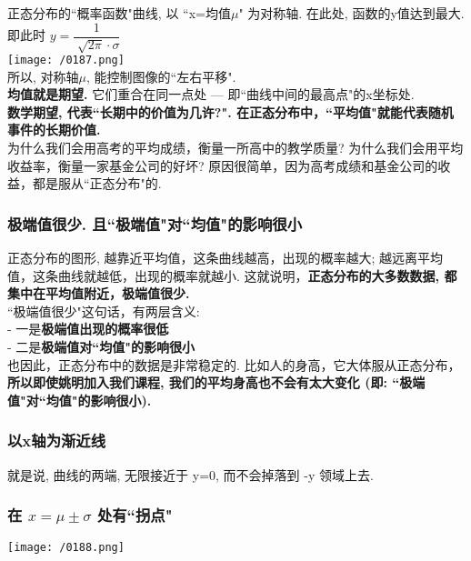 \documentclass[UTF8]{ctexart}
\begin{document}
正态分布的``概率函数"曲线, 以 ``x=均值$\mu$" 为对称轴. 在此处, 函数的y值达到最大. 即此时 $y=\dfrac{1}{\sqrt[]{2\pi}\cdot \sigma}$ \\

\texttt{[image: /0187.png]} \\

所以, 对称轴$\mu$, 能控制图像的``左右平移". \\

\textbf{均值就是期望.} 它们重合在同一点处 --- 即``曲线中间的最高点"的x坐标处. \\
\textbf{数学期望, 代表``长期中的价值为几许?". 在正态分布中，``平均值"就能代表随机事件的长期价值.} \\

为什么我们会用高考的平均成绩，衡量一所高中的教学质量? 为什么我们会用平均收益率，衡量一家基金公司的好坏? 原因很简单，因为高考成绩和基金公司的收益，都是服从``正态分布"的.




\subsubsection{极端值很少. 且``极端值"对``均值"的影响很小}
正态分布的图形, 越靠近平均值，这条曲线越高，出现的概率越大; 越远离平均值，这条曲线就越低，出现的概率就越小. 这就说明，\textbf{正态分布的大多数数据, 都集中在平均值附近，极端值很少.} \\

``极端值很少"这句话，有两层含义:  \\
- 一是\textbf{极端值出现的概率很低} \\
- 二是\textbf{极端值对``均值"的影响很小} \\

也因此，正态分布中的数据是非常稳定的. 比如人的身高，它大体服从正态分布，\textbf{所以即使姚明加入我们课程, 我们的平均身高也不会有太大变化 (即: ``极端值"对``均值"的影响很小).}




\subsubsection{以x轴为渐近线}
就是说, 曲线的两端, 无限接近于 y=0, 而不会掉落到 -y 领域上去.



\subsubsection{在 $x=\mu \pm \sigma $ 处有``拐点"}
\texttt{[image: /0188.png]} 
\end{document}
